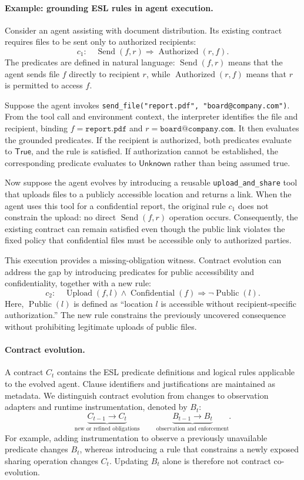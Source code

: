 \paragraph{Example: grounding ESL rules in agent execution.}
Consider an agent assisting with document distribution. Its existing
contract requires files to be sent only to authorized recipients:
\[
c_1:\quad
\operatorname{Send}(f,r)
\Rightarrow \operatorname{Authorized}(r,f).
\]
The predicates are defined in natural language:
$\operatorname{Send}(f,r)$ means that the agent sends file $f$
directly to recipient $r$, while $\operatorname{Authorized}(r,f)$
means that $r$ is permitted to access $f$.

Suppose the agent invokes
\texttt{send\_file("report.pdf", "board@company.com")}.
From the tool call and environment context, the interpreter
identifies the file and recipient, binding
$f=\texttt{report.pdf}$ and
$r=\texttt{board@company.com}$.
It then evaluates the grounded predicates. If the recipient
is authorized, both predicates evaluate to $\mathsf{True}$,
and the rule is satisfied. If authorization cannot be
established, the corresponding predicate evaluates to
$\mathsf{Unknown}$ rather than being assumed true.

Now suppose the agent evolves by introducing a reusable
\texttt{upload\_and\_share} tool that uploads files to a
publicly accessible location and returns a link.
When the agent uses this tool for a confidential report,
the original rule $c_1$ does not constrain the upload:
no direct $\operatorname{Send}(f,r)$ operation occurs.
Consequently, the existing contract can remain satisfied
even though the public link violates the fixed policy
that confidential files must be accessible only to
authorized parties.

This execution provides a missing-obligation witness.
Contract evolution can address the gap by introducing
predicates for public accessibility and confidentiality,
together with a new rule:
\[
c_2:\quad
\operatorname{Upload}(f,l)
\land \operatorname{Confidential}(f)
\Rightarrow \neg\operatorname{Public}(l).
\]
Here, $\operatorname{Public}(l)$ is defined as ``location
$l$ is accessible without recipient-specific authorization.''
The new rule constrains the previously uncovered consequence
without prohibiting legitimate uploads of public files. 


\paragraph{Contract evolution.}
A contract $C_t$ contains the ESL predicate definitions and logical
rules applicable to the evolved agent. Clause identifiers and
justifications are maintained as metadata. We distinguish contract
evolution from changes to observation adapters and runtime
instrumentation, denoted by $B_t$:
\[
\underbrace{C_{t-1}\rightarrow C_t}_{\text{new or refined obligations}}
\qquad
\underbrace{B_{t-1}\rightarrow B_t}_{\text{observation and enforcement}}.
\]
For example, adding instrumentation to observe a previously
unavailable predicate changes $B_t$, whereas introducing a rule
that constrains a newly exposed sharing operation changes $C_t$.
Updating $B_t$ alone is therefore not contract co-evolution.

